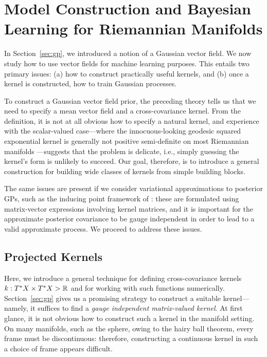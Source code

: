 \section{Model Construction and Bayesian Learning for Riemannian Manifolds}
\label{sec:model construction}

In Section~\ref{sec:gp}, we introduced a notion of a Gaussian vector field.
We now study how to use vector fields for machine learning purposes.
This entails two primary issues: (a) how to construct practically useful kernels, and (b) once a kernel is constructed, how to train Gaussian processes.

To construct a Gaussian vector field prior, the preceding theory tells us that we need to specify a mean vector field and a cross-covariance kernel.
From the definition, it is not at all obvious how to specify a natural kernel, and experience with the scalar-valued case---where the innocuous-looking geodesic squared exponential kernel is generally not positive semi-definite on most Riemannian manifolds \cite{feragen2015geodesic}---suggests that the problem is delicate, i.e., simply guessing the kernel's form is unlikely to succeed.
Our goal, therefore, is to introduce a general construction for building wide classes of kernels from simple building blocks.

The same issues are present if we consider variational approximations to posterior GPs, such as the inducing point framework of \textcite{Titsias2009}: these are formulated using matrix-vector expressions involving kernel matrices, and it is important for the approximate posterior covariance to be gauge independent in order to lead to a valid approximate process.
We proceed to address these issues.

\subsection{Projected Kernels}

Here, we introduce a general technique for defining cross-covariance kernels $k : T^*X \times T^*X \-> \mathbb{R}$ and for working with such functions numerically.
Section~\ref{sec:gp} gives us a promising strategy to construct a suitable kernel---namely, it suffices to find a \emph{gauge independent matrix-valued kernel}.
At first glance, it is not obvious how to construct such a kernel in the manifold setting.
On many manifolds, such as the sphere, owing to the hairy ball theorem, every frame must be discontinuous: therefore, constructing a continuous kernel in such a choice of frame appears difficult.

